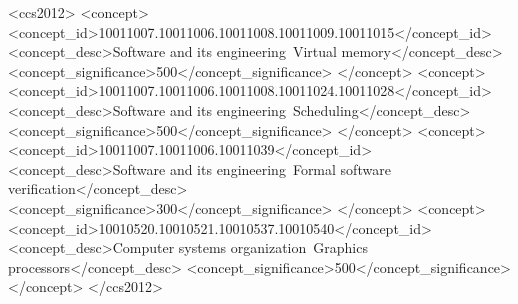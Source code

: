 \documentclass[sigplan,screen,pbalance]{acmart}
\newcommand{\sys}{gpu\_ext\xspace}
\begin{document}
%

\begin{CCSXML}
<ccs2012>
   <concept>
       <concept_id>10011007.10011006.10011008.10011009.10011015</concept_id>
       <concept_desc>Software and its engineering~Virtual memory</concept_desc>
       <concept_significance>500</concept_significance>
       </concept>
   <concept>
       <concept_id>10011007.10011006.10011008.10011024.10011028</concept_id>
       <concept_desc>Software and its engineering~Scheduling</concept_desc>
       <concept_significance>500</concept_significance>
       </concept>
   <concept>
       <concept_id>10011007.10011006.10011039</concept_id>
       <concept_desc>Software and its engineering~Formal software verification</concept_desc>
       <concept_significance>300</concept_significance>
       </concept>
   <concept>
       <concept_id>10010520.10010521.10010537.10010540</concept_id>
       <concept_desc>Computer systems organization~Graphics processors</concept_desc>
       <concept_significance>500</concept_significance>
       </concept>
 </ccs2012>
\end{CCSXML}
\end{document}
